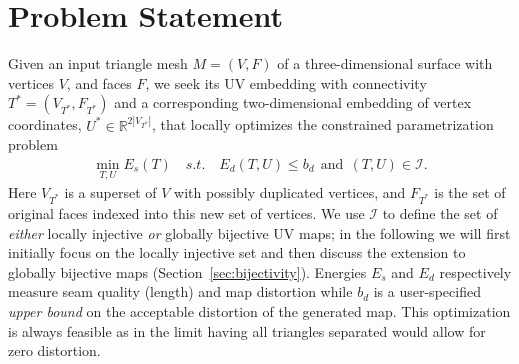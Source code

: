 
\section{Problem Statement}

Given an input triangle mesh $M=(V,F)$ of a three-dimensional surface with vertices $V$, and faces $F$, we seek its UV embedding with connectivity $T^*=(V_{T^*}, F_{T^*})$ and a corresponding two-dimensional embedding of vertex coordinates, $U^* \in \mathbb{R}^{2 |V_{T^*}|}$, that locally optimizes the constrained parametrization problem
%
\begin{align}
	\min_{T,U} E_s(T) \quad s.t. \quad E_d(T,U) \leq b_d\ \ \text{and}\ \ (T, U) \in \mathcal{I}.
	\label{eq:p1}
\end{align}
%
Here $V_{T^*}$ is a superset of $V$ with possibly duplicated vertices, and $F_{T^*}$ is the set of original faces indexed into this new set of vertices. We use $\mathcal{I}$ to define the set of \emph{either} locally injective \emph{or} globally bijective UV maps; in the following we will first initially focus on the locally injective set and then discuss the extension to globally bijective maps (Section~\ref{sec:bijectivity}). Energies $E_s$ and $E_d$ respectively measure seam quality (length) and map distortion while $b_d$ is a user-specified \emph{upper bound} on the acceptable distortion of the generated map. This optimization is always feasible as in the limit having all triangles separated would allow for zero distortion. %

